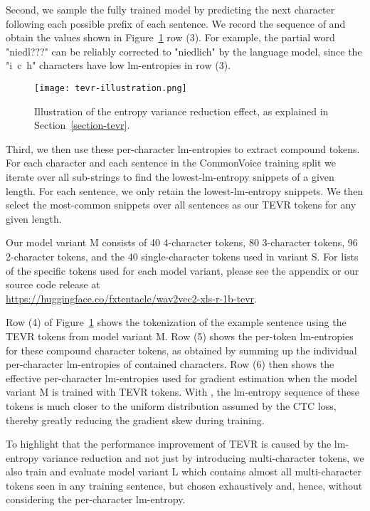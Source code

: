 \documentclass{article} \usepackage{iclr2022_conference,times}
\begin{document}
Second, we sample the fully trained model by predicting the next character following each possible prefix of each sentence. We record the sequence of  and obtain the values shown in Figure~\ref{figure-tevr} row (3). For example, the partial word "niedl???" can be reliably corrected to "niedlich" by the language model, since the "i~c~h" characters have low lm-entropies in row (3).

\begin{figure}[h]
\begin{center}
\texttt{[image: tevr-illustration.png]}
\end{center}
\caption{Illustration of the entropy variance reduction effect, as explained in Section~\ref{section-tevr}. }
\label{figure-tevr}
\end{figure}


Third, we then use these per-character lm-entropies to extract compound tokens. For each character and each sentence in the CommonVoice training split we iterate over all sub-strings to find the lowest-lm-entropy snippets of a given length. For each sentence, we only retain the  lowest-lm-entropy snippets. We then select the most-common snippets over all sentences as our TEVR tokens for any given length. 

Our model variant M consists of 40 4-character tokens, 80 3-character tokens, 96 2-character tokens, and the 40 single-character tokens used in variant S.
For lists of the specific tokens used for each model variant, please see the appendix or our source code release at\\
\url{https://huggingface.co/fxtentacle/wav2vec2-xls-r-1b-tevr}.

Row (4) of Figure~\ref{figure-tevr} shows the tokenization of the example sentence using the TEVR tokens from model variant M. 
Row (5) shows the per-token lm-entropies for these compound character tokens, as obtained by summing up the individual per-character lm-entropies of contained characters. 
Row (6) then shows the effective per-character lm-entropies used for gradient estimation when the model variant M is trained with TEVR tokens. With , the lm-entropy sequence of these tokens is much closer to the uniform distribution assumed by the CTC loss, thereby greatly reducing the gradient skew during training.

To highlight that the performance improvement of TEVR is caused by the lm-entropy variance reduction and not just by introducing multi-character tokens, we also train and evaluate model variant L which contains almost all multi-character tokens seen in any training sentence, but chosen exhaustively and, hence, without considering the per-character lm-entropy.
\end{document}
